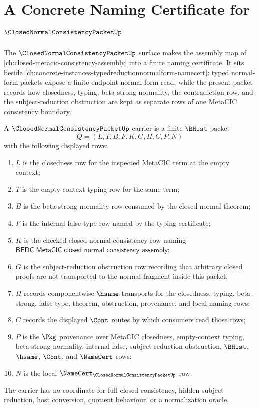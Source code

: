 \chapter{A Concrete Naming Certificate for $\ClosedNormalConsistencyPacketUp$}
\label{ch:concrete-instances-closednormalconsistencypacket-namecert}

The $\ClosedNormalConsistencyPacketUp$ surface makes the assembly map of \autoref{ch:closed-metacic-consistency-assembly} into a finite naming certificate. It sits beside \autoref{ch:concrete-instances-typedreductionnormalform-namecert}: typed normal-form packets expose a finite endpoint normal-form read, while the present packet records how closedness, typing, beta-strong normality, the contradiction row, and the subject-reduction obstruction are kept as separate rows of one MetaCIC consistency boundary.

\begin{definition}
\label{def:closed-normal-consistency-packet-carrier}
A $\ClosedNormalConsistencyPacketUp$ carrier is a finite $\BHist$ packet
$$
Q=(L,T,B,F,K,G,H,C,P,N)
$$
with the following displayed rows:
\begin{enumerate}
\item $L$ is the closedness row for the inspected MetaCIC term at the empty context;
\item $T$ is the empty-context typing row for the same term;
\item $B$ is the beta-strong normality row consumed by the closed-normal theorem;
\item $F$ is the internal false-type row named by the typing certificate;
\item $K$ is the checked closed-normal consistency row naming $\mathsf{BEDC.MetaCIC.closed\_normal\_consistency\_assembly}$;
\item $G$ is the subject-reduction obstruction row recording that arbitrary closed proofs are not transported to the normal fragment inside this packet;
\item $H$ records componentwise $\hsame$ transports for the closedness, typing, beta-strong, false-type, theorem, obstruction, provenance, and local naming rows;
\item $C$ records the displayed $\Cont$ routes by which consumers read those rows;
\item $P$ is the $\Pkg$ provenance over MetaCIC closedness, empty-context typing, beta-strong normality, internal false, subject-reduction obstruction, $\BHist$, $\hsame$, $\Cont$, and $\NameCert$ rows;
\item $N$ is the local $\NameCert_{\ClosedNormalConsistencyPacketUp}$ row.
\end{enumerate}
The carrier has no coordinate for full closed consistency, hidden subject reduction, host conversion, quotient behaviour, or a normalization oracle.
\end{definition}

